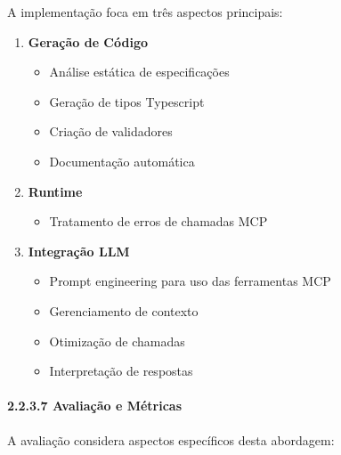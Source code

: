 \documentclass[
]{article}
\providecommand{\tightlist}{%
  \setlength{\itemsep}{0pt}\setlength{\parskip}{0pt}}
\begin{document}
A implementação foca em três aspectos principais:

\begin{enumerate}
\def\labelenumi{\arabic{enumi}.}
\tightlist
\item
  \textbf{Geração de Código}

  \begin{itemize}
  \tightlist
  \item
    Análise estática de especificações
  \item
    Geração de tipos Typescript
  \item
    Criação de validadores
  \item
    Documentação automática
  \end{itemize}
\item
  \textbf{Runtime}

  \begin{itemize}
  \tightlist
  \item
    Tratamento de erros de chamadas MCP
  \end{itemize}
\item
  \textbf{Integração LLM}

  \begin{itemize}
  \tightlist
  \item
    Prompt engineering para uso das ferramentas MCP
  \item
    Gerenciamento de contexto
  \item
    Otimização de chamadas
  \item
    Interpretação de respostas
  \end{itemize}
\end{enumerate}

\paragraph{2.2.3.7 Avaliação e
Métricas}\label{avaliauxe7uxe3o-e-muxe9tricas-1}

A avaliação considera aspectos específicos desta abordagem:
\end{document}
